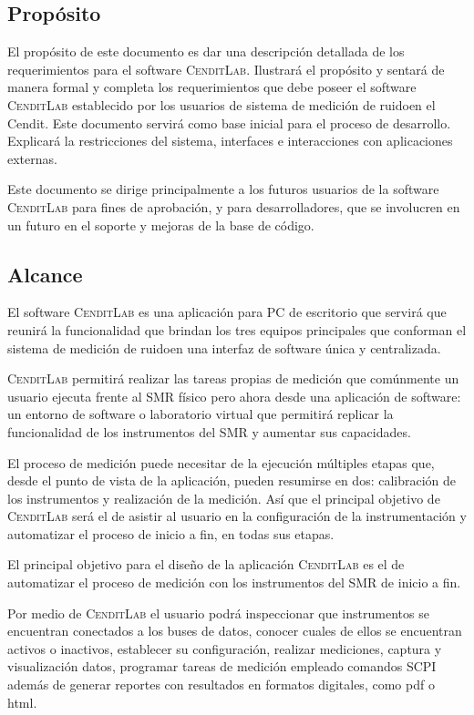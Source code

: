 \documentclass[paper=a4,oneside,fontsize=12pt]{article}
\newcommand{\AppName}{\textsc{CenditLab}\xspace}
\newcommand{\smr}{sistema de medición de ruido}
\newcommand{\SMR}{SMR\xspace}
\newcommand{\cendit}{Cendit\xspace}
\begin{document}
	\subsection{Propósito}
	El propósito de este documento es dar una descripción detallada de los requerimientos para el software \AppName. Ilustrará el propósito y sentará de manera formal y completa los requerimientos que debe poseer el software \AppName establecido por los usuarios de \smr en el \cendit. Este documento servirá como base inicial para el proceso de desarrollo. Explicará la restricciones del sistema, interfaces e interacciones con aplicaciones externas. 
	
	Este documento se dirige principalmente a los futuros usuarios de la software \AppName para fines de aprobación, y para desarrolladores, que se involucren en un futuro en el soporte y mejoras de la base de código.
	
	\subsection{Alcance}
	
	El software \AppName es una aplicación para PC de escritorio que servirá que reunirá la funcionalidad que brindan los tres equipos principales que conforman el \smr en una interfaz de software única y centralizada.  
	
	\AppName permitirá realizar las tareas propias de medición que comúnmente un usuario ejecuta frente al \SMR físico pero ahora desde una aplicación de software: un entorno de software o laboratorio virtual que permitirá replicar la funcionalidad de los instrumentos del \SMR y aumentar sus capacidades.	

	El proceso de medición puede necesitar de la ejecución múltiples etapas que, desde el punto de vista de la aplicación, pueden resumirse en dos: calibración de los instrumentos y realización de la medición. Así que el principal objetivo de \AppName será el de asistir al usuario en la configuración de la instrumentación y automatizar el proceso de inicio a fin, en todas sus etapas.		
	
	El principal objetivo para el diseño de la aplicación \AppName es el de automatizar el proceso de medición con los instrumentos del \SMR de inicio a fin. 
	
	Por medio de \AppName el usuario podrá inspeccionar que instrumentos se encuentran conectados a los buses de datos, conocer cuales de ellos se encuentran activos o inactivos, establecer su configuración, realizar mediciones, captura y visualización datos, programar tareas de medición empleado comandos SCPI además de generar reportes con resultados en formatos digitales, como pdf o html. 
	
\end{document}
